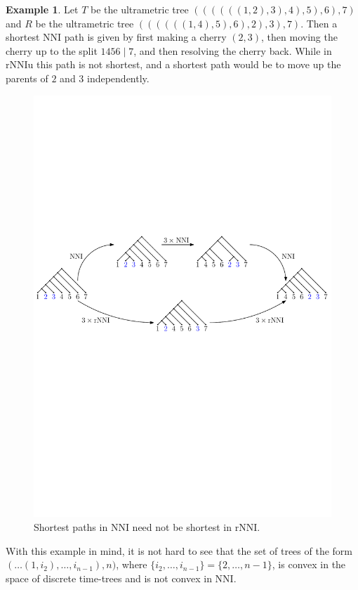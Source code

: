 \documentclass{amsart}
\theoremstyle{definition}
\newtheorem{example}[lemma]{Example}
\newcommand{\nni}{\mathrm{NNI}}
\newcommand{\rnni}{\mathrm{rNNI}}
\newcommand{\rnniu}{\mathrm{rNNIu}}
\begin{document}
\begin{example}
Let $T$ be the ultrametric tree $((((((1, 2), 3), 4), 5), 6), 7)$ and $R$ be the ultrametric tree $((((((1, 4), 5), 6), 2), 3), 7)$.
Then a shortest $\nni$ path is given by first making a cherry $(2,3)$, then moving the cherry up to the split $1456 \mid 7$, and then resolving the cherry back.
While in $\rnniu$ this path is not shortest, and a shortest path would be to move up the parents of $2$ and $3$ independently.

\begin{figure}[ht]
\centering
\includegraphics[width=\textwidth]{NNI_VS_rNNI.pdf}
\caption{Shortest paths in $\nni$ need not be shortest in $\rnni$.}
\label{NNI_VS_rNNI.pdf}
\end{figure}
\end{example}

With this example in mind, it is not hard to see that the set of trees of the form $(\ldots(1, i_2), \ldots, i_{n-1}), n)$, where $\{i_2, \ldots, i_{n-1}\} = \{2, \ldots, n-1\}$, is convex in the space of discrete time-trees and is not convex in $\nni$.
\end{document}

